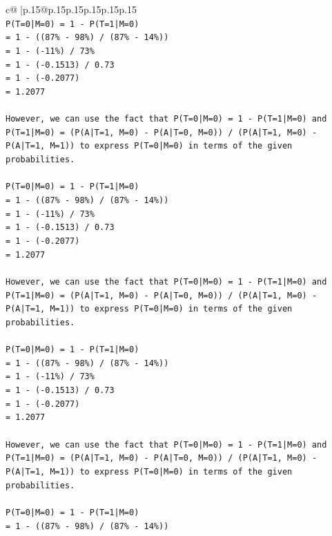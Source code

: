 \documentclass{article}
\begin{document}
{\begin{supertabular}{c@{$\;$}|p{.15\linewidth}@{}p{.15\linewidth}p{.15\linewidth}p{.15\linewidth}p{.15\linewidth}p{.15\linewidth}}
{{{\\ 
\texttt{P(T=0|M=0) = 1 {-} P(T=1|M=0)} \\
\texttt{= 1 {-} ((87\% {-} 98\%) / (87\% {-} 14\%))} \\
\texttt{= 1 {-} ({-}11\%) / 73\%} \\
\texttt{= 1 {-} ({-}0.1513) / 0.73} \\
\texttt{= 1 {-} ({-}0.2077)} \\
\texttt{= 1.2077} \\
\\ 
\texttt{However, we can use the fact that P(T=0|M=0) = 1 {-} P(T=1|M=0) and P(T=1|M=0) = (P(A|T=1, M=0) {-} P(A|T=0, M=0)) / (P(A|T=1, M=0) {-} P(A|T=1, M=1)) to express P(T=0|M=0) in terms of the given probabilities.} \\
\\ 
\texttt{P(T=0|M=0) = 1 {-} P(T=1|M=0)} \\
\texttt{= 1 {-} ((87\% {-} 98\%) / (87\% {-} 14\%))} \\
\texttt{= 1 {-} ({-}11\%) / 73\%} \\
\texttt{= 1 {-} ({-}0.1513) / 0.73} \\
\texttt{= 1 {-} ({-}0.2077)} \\
\texttt{= 1.2077} \\
\\ 
\texttt{However, we can use the fact that P(T=0|M=0) = 1 {-} P(T=1|M=0) and P(T=1|M=0) = (P(A|T=1, M=0) {-} P(A|T=0, M=0)) / (P(A|T=1, M=0) {-} P(A|T=1, M=1)) to express P(T=0|M=0) in terms of the given probabilities.} \\
\\ 
\texttt{P(T=0|M=0) = 1 {-} P(T=1|M=0)} \\
\texttt{= 1 {-} ((87\% {-} 98\%) / (87\% {-} 14\%))} \\
\texttt{= 1 {-} ({-}11\%) / 73\%} \\
\texttt{= 1 {-} ({-}0.1513) / 0.73} \\
\texttt{= 1 {-} ({-}0.2077)} \\
\texttt{= 1.2077} \\
\\ 
\texttt{However, we can use the fact that P(T=0|M=0) = 1 {-} P(T=1|M=0) and P(T=1|M=0) = (P(A|T=1, M=0) {-} P(A|T=0, M=0)) / (P(A|T=1, M=0) {-} P(A|T=1, M=1)) to express P(T=0|M=0) in terms of the given probabilities.} \\
\\ 
\texttt{P(T=0|M=0) = 1 {-} P(T=1|M=0)} \\
\texttt{= 1 {-} ((87\% {-} 98\%) / (87\% {-} 14\%))} \\
}}}
\end{supertabular}}
\end{document}
